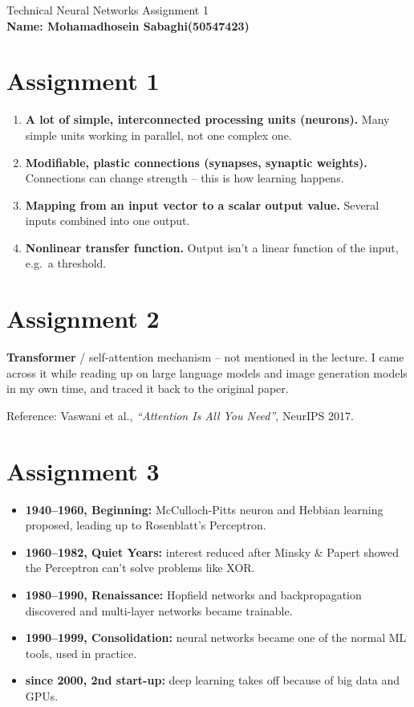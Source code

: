 \documentclass[11pt,a4paper]{article}
\begin{document}
\begin{center}
{\large Technical Neural Networks Assignment 1}\\[4pt]
{\bfseries Name: Mohamadhosein Sabaghi(50547423)}
\end{center}

\section*{Assignment 1}

\begin{enumerate}
  \item \textbf{A lot of simple, interconnected processing units (neurons).} Many
  simple units working in parallel, not one complex one.
  \item \textbf{Modifiable, plastic connections (synapses, synaptic weights).}
  Connections can change strength -- this is how learning happens.
  \item \textbf{Mapping from an input vector to a scalar output value.} Several inputs
  combined into one output.
  \item \textbf{Nonlinear transfer function.} Output isn't a linear function of the
  input, e.g.\ a threshold.
\end{enumerate}

\section*{Assignment 2}

\textbf{Transformer} / self-attention mechanism -- not mentioned in the lecture. I came
across it while reading up on large language models and image generation models in my
own time, and traced it back to the original paper.

Reference: Vaswani et al., \emph{``Attention Is All You Need''}, NeurIPS 2017.

\section*{Assignment 3}

\begin{itemize}
  \item \textbf{1940--1960, Beginning:} McCulloch-Pitts neuron and Hebbian learning
  proposed, leading up to Rosenblatt's Perceptron.
  \item \textbf{1960--1982, Quiet Years:} interest reduced after Minsky \& Papert
  showed the Perceptron can't solve problems like XOR.
  \item \textbf{1980--1990, Renaissance:} Hopfield networks and backpropagation
  discovered and multi-layer networks became trainable.
  \item \textbf{1990--1999, Consolidation:} neural networks became one of the normal ML
  tools, used in practice.
  \item \textbf{since 2000, 2nd start-up:} deep learning takes off because of big data
  and GPUs.
\end{itemize}
\end{document}

